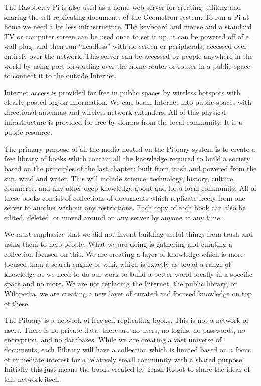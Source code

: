 The Raspberry Pi is also used as a home web server for creating, editing
and sharing the self-replicating documents of the Geometron system. To
run a Pi at home we need a lot less infrastructure. The keyboard and
mouse and a standard TV or computer screen can be used once to set it
up, it can be powered off of a wall plug, and then run ``headless'' with
no screen or peripherals, accessed over entirely over the network. This
server can be accessed by people anywhere in the world by using port
forwarding over the home router or router in a public space to connect
it to the outside Internet.

Internet access is provided for free in public spaces by wireless
hotspots with clearly posted log on information. We can beam Internet
into public spaces with directional antennas and wireless network
extenders. All of this physical infrastructure is provided for free by
donors from the local community. It is a public resource.

The primary purpose of all the media hosted on the Pibrary system is to
create a free library of books which contain all the knowledge required
to build a society based on the principles of the last chapter: built
from trash and powered from the sun, wind and water. This will include
science, technology, history, culture, commerce, and any other deep
knowledge about and for a local community. All of these books consist of
collections of documents which replicate freely from one server to
another without any restrictions. Each copy of each book can also be
edited, deleted, or moved around on any server by anyone at any time.

We must emphasize that we did not invent building useful things from
trash and using them to help people. What we are doing is gathering and
curating a collection focused on this. We are creating a layer of
knowledge which is more focused than a search engine or wiki, which is
exactly as broad a range of knowledge as we need to do our work to build
a better world locally in a specific space and no more. We are not
replacing the Internet, the public library, or Wikipedia, we are
creating a new layer of curated and focused knowledge on top of these.

The Pibrary is a network of free self-replicating books. This is not a
network of users. There is no private data, there are no users, no
logins, no passwords, no encryption, and no databases. While we are
creating a vast universe of documents, each Pibrary will have a
collection which is limited based on a focus of immediate interest for a
relatively small community with a shared purpose. Initially this just
means the books created by Trash Robot to share the ideas of this
network itself.

